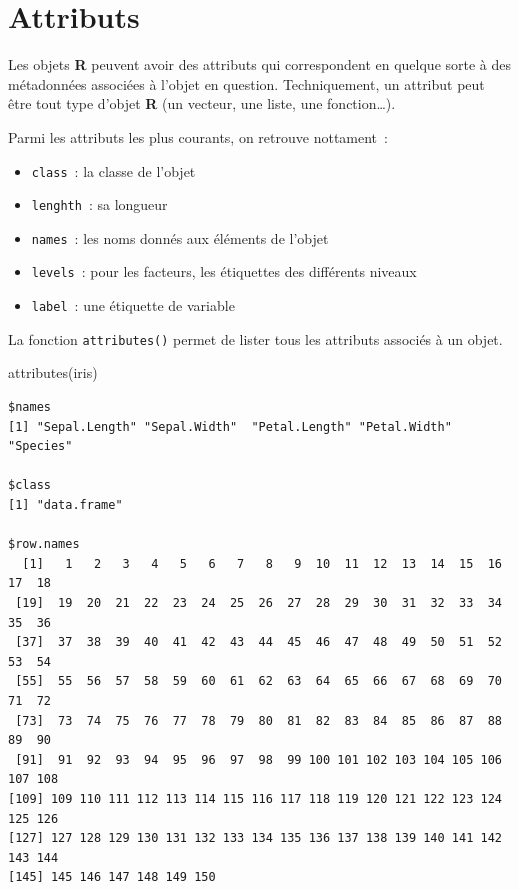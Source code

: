 \documentclass[
  letterpaper,
  DIV=11,
  numbers=noendperiod,
  oneside]{scrreprt}
\newenvironment{Shaded}{\begin{snugshade}}{\end{snugshade}}
\newcommand{\FunctionTok}[1]{\textcolor[rgb]{0.28,0.35,0.67}{#1}}
\newcommand{\NormalTok}[1]{\textcolor[rgb]{0.00,0.23,0.31}{#1}}
\providecommand{\tightlist}{%
  \setlength{\itemsep}{0pt}\setlength{\parskip}{0pt}}\usepackage{longtable,booktabs,array}
\begin{document}
\hypertarget{sec-attributs}{%
\chapter{Attributs}\label{sec-attributs}}

Les objets \textbf{R} peuvent avoir des attributs qui correspondent en
quelque sorte à des métadonnées associées à l'objet en question.
Techniquement, un attribut peut être tout type d'objet \textbf{R} (un
vecteur, une liste, une fonction\ldots).

Parmi les attributs les plus courants, on retrouve nottament~:

\begin{itemize}
\tightlist
\item
  \texttt{class}~: la classe de l'objet
\item
  \texttt{lenghth}~: sa longueur
\item
  \texttt{names}~: les noms donnés aux éléments de l'objet
\item
  \texttt{levels}~: pour les facteurs, les étiquettes des différents
  niveaux
\item
  \texttt{label}~: une étiquette de variable
\end{itemize}

La fonction \texttt{attributes()} permet de lister tous les attributs
associés à un objet.

\begin{Shaded}
\begin{Highlighting}[]
\FunctionTok{attributes}\NormalTok{(iris)}
\end{Highlighting}
\end{Shaded}

\begin{verbatim}
$names
[1] "Sepal.Length" "Sepal.Width"  "Petal.Length" "Petal.Width"  "Species"     

$class
[1] "data.frame"

$row.names
  [1]   1   2   3   4   5   6   7   8   9  10  11  12  13  14  15  16  17  18
 [19]  19  20  21  22  23  24  25  26  27  28  29  30  31  32  33  34  35  36
 [37]  37  38  39  40  41  42  43  44  45  46  47  48  49  50  51  52  53  54
 [55]  55  56  57  58  59  60  61  62  63  64  65  66  67  68  69  70  71  72
 [73]  73  74  75  76  77  78  79  80  81  82  83  84  85  86  87  88  89  90
 [91]  91  92  93  94  95  96  97  98  99 100 101 102 103 104 105 106 107 108
[109] 109 110 111 112 113 114 115 116 117 118 119 120 121 122 123 124 125 126
[127] 127 128 129 130 131 132 133 134 135 136 137 138 139 140 141 142 143 144
[145] 145 146 147 148 149 150
\end{verbatim}
\end{document}
